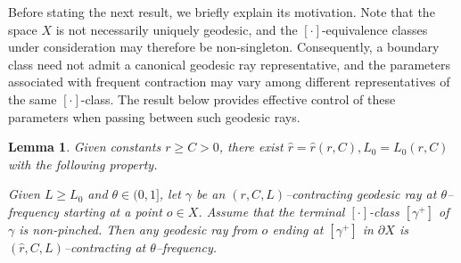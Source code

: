 \documentclass{amsart}
\newtheorem{lem}[thm]{Lemma}
\theoremstyle{definition}
\theoremstyle{remark}
\newcommand{\U}{ X}
\newcommand{\pU}{\partial{  X}}
\begin{document}
Before stating the next result, we briefly explain its motivation.
Note that the space $X$ is not necessarily uniquely geodesic, and the $[\cdot]$-equivalence classes under consideration may therefore be non-singleton. Consequently, a boundary class need not admit a canonical geodesic ray representative, and the parameters associated with frequent contraction may vary among different representatives of the same $[\cdot]$-class. The result below provides effective control of these parameters when passing between such geodesic rays.

\begin{lem}\label{RegContrRayClass}
Given constants $r\ge C>0$, there exist $\hat r=\hat r(r,C), L_0=L_0(r,C)$ with the following property.

Given $L\ge L_0$ and $\theta\in (0,1]$, let $\gamma$  be an $(r, C, L)$--contracting  geodesic ray  at $\theta$–frequency starting at a point $o\in \U$. Assume that the terminal $[\cdot]$-class $[\gamma^+]$ of  $\gamma$ is non-pinched. Then any geodesic ray from $o$ ending at $[\gamma^+]$ in $\pU$ is $(\hat r, C, L)$--contracting   at $\theta$–frequency.
\end{lem}
\end{document}
